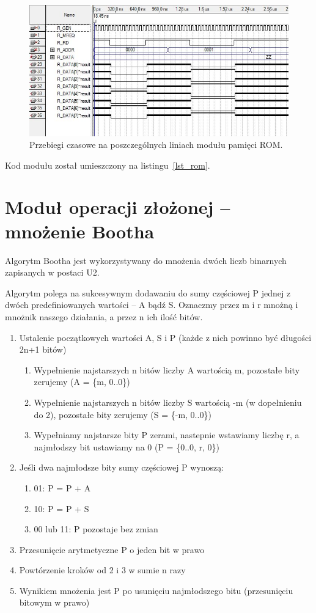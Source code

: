 \documentclass[a4paper,12pt]{report}
\begin{document}
\begin{figure}[h]
\centering
\includegraphics[width=15cm]{./pict/rom.jpg}
\caption{Przebiegi czasowe na poszczególnych liniach modułu pamięci ROM.}
\label{fig:rom}
\end{figure}

Kod modułu został umieszczony na listingu~\ref{lst_rom}.

\section{Moduł operacji złożonej -- mnożenie Bootha}

Algorytm Bootha jest wykorzystywany do mnożenia dwóch liczb binarnych zapisanych w postaci U2.

Algorytm polega na sukcesywnym dodawaniu do sumy częściowej P jednej z dwóch predefiniowanych wartości -- A bądź S. Oznaczmy przez m i r mnożną i mnożnik naszego działania, a przez n ich ilość bitów.

\begin{enumerate}
  \item Ustalenie początkowych wartości A, S i P (każde z nich powinno być długości 2n+1 bitów)
  \begin{enumerate}
    \item Wypełnienie najstarszych n bitów liczby A wartością m, pozostałe bity zerujemy (A = \{m, 0..0\})
    \item Wypełnienie najstarszych n bitów liczby S wartością -m (w dopełnieniu do 2), pozostałe bity zerujemy (S = \{-m, 0..0\})
    \item Wypełniamy najstarsze bity P zerami, nastepnie wstawiamy liczbę r, a najmłodszy bit ustawiamy na 0 (P = \{0..0, r, 0\})
  \end{enumerate}
  \item Jeśli dwa najmłodsze bity sumy częściowej P wynoszą:
  \begin{enumerate}
    \item 01: P = P + A
    \item 10: P = P + S
    \item 00 lub 11: P pozostaje bez zmian
  \end{enumerate}
  \item Przesunięcie arytmetyczne P o jeden bit w prawo
  \item Powtórzenie kroków od 2 i 3 w sumie n razy
  \item Wynikiem mnożenia jest P po usunięciu najmłodszego bitu (przesunięciu bitowym w prawo)
\end{enumerate}
\end{document}

